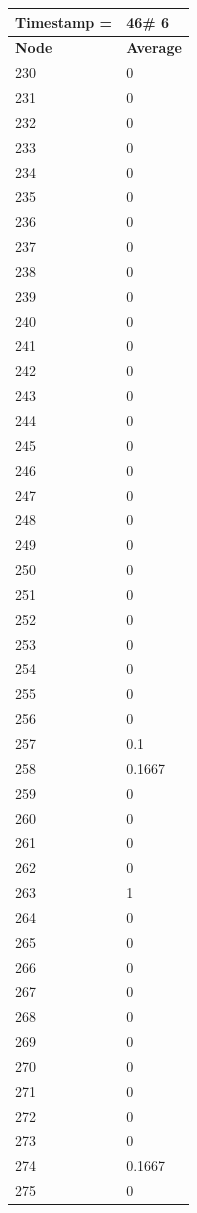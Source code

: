 \begin{tabular}{|l||l|}
\hline
\textbf{Timestamp =} & \textbf{46}\# 6\\\hline
	\textbf{Node} & \textbf{Average} \\ \hline
\hline
	230 & 0 \\ \hline
	231 & 0 \\ \hline
	232 & 0 \\ \hline
	233 & 0 \\ \hline
	234 & 0 \\ \hline
	235 & 0 \\ \hline
	236 & 0 \\ \hline
	237 & 0 \\ \hline
	238 & 0 \\ \hline
	239 & 0 \\ \hline
	240 & 0 \\ \hline
	241 & 0 \\ \hline
	242 & 0 \\ \hline
	243 & 0 \\ \hline
	244 & 0 \\ \hline
	245 & 0 \\ \hline
	246 & 0 \\ \hline
	247 & 0 \\ \hline
	248 & 0 \\ \hline
	249 & 0 \\ \hline
	250 & 0 \\ \hline
	251 & 0 \\ \hline
	252 & 0 \\ \hline
	253 & 0 \\ \hline
	254 & 0 \\ \hline
	255 & 0 \\ \hline
	256 & 0 \\ \hline
	257 & 0.1 \\ \hline
	258 & 0.1667 \\ \hline
	259 & 0 \\ \hline
	260 & 0 \\ \hline
	261 & 0 \\ \hline
	262 & 0 \\ \hline
	263 & 1 \\ \hline
	264 & 0 \\ \hline
	265 & 0 \\ \hline
	266 & 0 \\ \hline
	267 & 0 \\ \hline
	268 & 0 \\ \hline
	269 & 0 \\ \hline
	270 & 0 \\ \hline
	271 & 0 \\ \hline
	272 & 0 \\ \hline
	273 & 0 \\ \hline
	274 & 0.1667 \\ \hline
	275 & 0 \\ \hline
\end{tabular}

